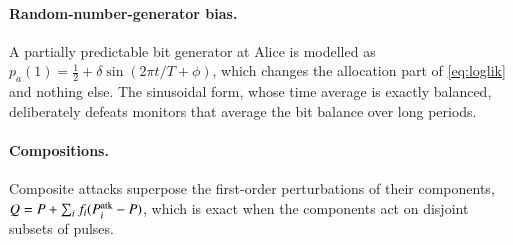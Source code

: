 \paragraph{Random-number-generator bias.} A partially predictable bit generator at Alice is modelled as $p_a(1)=\tfrac12+\delta\sin(2\pi t/T+\phi)$, which changes the allocation part of \cref{eq:loglik} and nothing else. The sinusoidal form, whose time average is exactly balanced, deliberately defeats monitors that average the bit balance over long periods.

\paragraph{Compositions.} Composite attacks superpose the first-order perturbations of their components, $Q=P+\sum_i f_i(P^{\rm atk}_i-P)$, which is exact when the components act on disjoint subsets of pulses.
